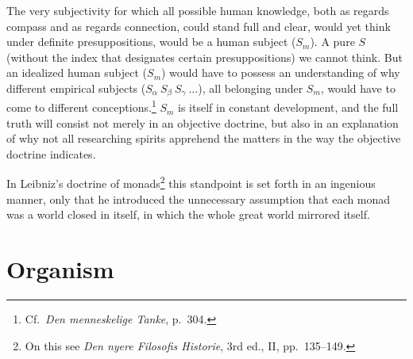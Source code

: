 \documentclass[12pt]{book}
\newcommand{\opage}[1]{\marginnote{\footnotesize\textit{[#1]}}}
\begin{document}
The very subjectivity for which all possible human knowledge, both as regards compass and as regards
connection, could stand full and clear, would yet think under definite presuppositions, would be a
human subject ($S_m$). A pure $S$ (without the index that designates certain \opage{20}presuppositions) we
cannot think. But an idealized human subject ($S_m$) would have to possess an understanding of why
different empirical subjects ($S_\alpha\ S_\beta\ S_\gamma\ \ldots$), all belonging under $S_m$, would
have to come to different conceptions.\footnote{Cf.\ \textit{Den menneskelige Tanke}, p.\ 304.} $S_m$
is itself in constant development, and the full truth will consist not merely in an objective doctrine,
but also in an explanation of why not all researching spirits apprehend the matters in the way the
objective doctrine indicates.

In Leibniz's doctrine of monads\footnote{On this see \textit{Den nyere Filosofis Historie}, 3rd ed.,
II, pp.\ 135--149.} this standpoint is set forth in an ingenious manner, only that he introduced the
unnecessary assumption that each monad was a world closed in itself, in which the whole great world
mirrored itself.

\chapter{Organism}
\label{ch:2}
\end{document}
